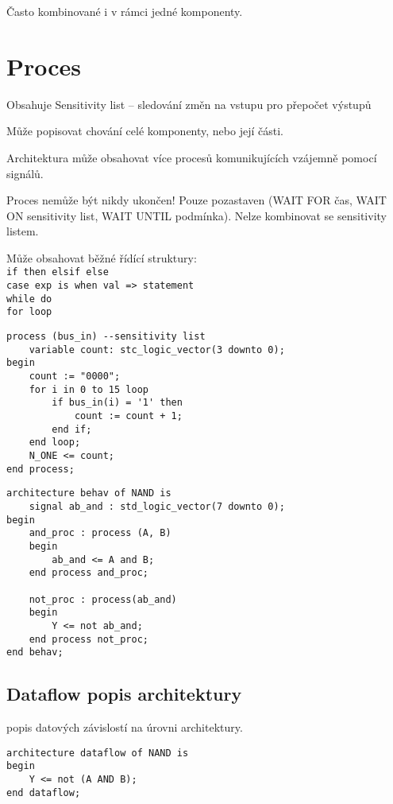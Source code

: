 \documentclass[a4paper, 11pt]{report}
\begin{document}
Často kombinované i v rámci jedné komponenty.

\section{Proces}

Obsahuje Sensitivity list -- sledování změn na vstupu pro přepočet výstupů

Může popisovat chování celé komponenty, nebo její části.

Architektura může obsahovat více procesů komunikujících vzájemně pomocí signálů.

Proces nemůže být nikdy ukončen! Pouze pozastaven (WAIT FOR čas, WAIT ON sensitivity list, WAIT UNTIL podmínka). Nelze kombinovat se sensitivity listem.

Může obsahovat běžné řídící struktury:\\
\verb|if then elsif else|\\
\verb|case exp is when val => statement|\\
\verb|while do| \\
\verb|for loop| \\

\lstset{caption=Jednoduchý příklad procesu}
\begin{lstlisting}
process (bus_in) --sensitivity list
	variable count: stc_logic_vector(3 downto 0);
begin
	count := "0000";
	for i in 0 to 15 loop
		if bus_in(i) = '1' then
			count := count + 1;
		end if;
	end loop;
	N_ONE <= count;
end process;
\end{lstlisting}

\begin{lstlisting}
architecture behav of NAND is
	signal ab_and : std_logic_vector(7 downto 0);
begin
	and_proc : process (A, B)
	begin
		ab_and <= A and B;
	end process and_proc;
	
	not_proc : process(ab_and)
	begin
		Y <= not ab_and;
	end process not_proc;
end behav;
\end{lstlisting}

\subsection{Dataflow popis architektury}

popis datových závislostí na úrovni architektury.

\begin{lstlisting}
architecture dataflow of NAND is
begin
	Y <= not (A AND B);
end dataflow;
\end{lstlisting}
\end{document}

